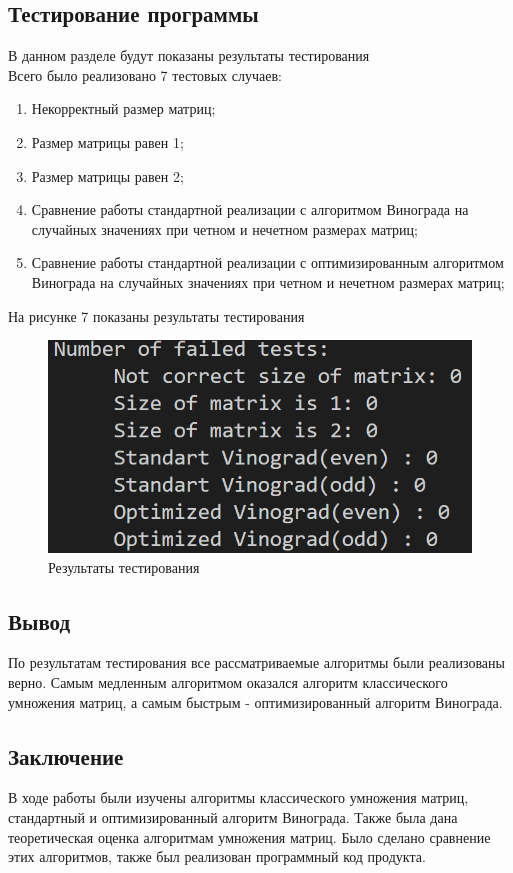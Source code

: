 \documentclass[a4paper, 12pt]{article}
\begin{document}
\begin{flushleft}
	\subsection{Тестирование программы}
	В данном разделе будут показаны результаты тестирования
	\\ \hspace*{5mm} Всего было реализовано 7 тестовых случаев:
	\begin{enumerate}
		\item Некорректный размер матриц;
		\item Размер матрицы равен 1;
		\item Размер матрицы равен 2; 
		\item Сравнение работы стандартной реализации с алгоритмом Винограда на случайных значениях при четном и нечетном размерах матриц;
		\item Сравнение работы стандартной реализации с оптимизированным алгоритмом Винограда на случайных значениях при четном и нечетном размерах матриц;
	\end{enumerate}
	\hspace*{5mm} На рисунке 7 показаны результаты тестирования
	\begin{figure}[h]
		\centering \includegraphics[scale=1.2]{tests}
		\centering\caption{Результаты тестирования}
	\end{figure}
	\subsection{Вывод}
	\hspace*{5mm} По результатам тестирования все рассматриваемые алгоритмы были реализованы верно. Самым медленным алгоритмом оказался алгоритм классического умножения матриц, а самым быстрым - оптимизированный алгоритм Винограда.
\end{flushleft}

\begin{flushleft}
	\newpage
	\section*{Заключение}
	\hspace*{5mm} В ходе работы были изучены алгоритмы классического умножения матриц, стандартный и оптимизированный алгоритм Винограда. Также была дана теоретическая оценка алгоритмам умножения матриц. Было сделано сравнение этих алгоритмов, также был реализован программный код продукта.  
\end{flushleft}

\clearpage
\newpage

\printbibliography
\end{document}
